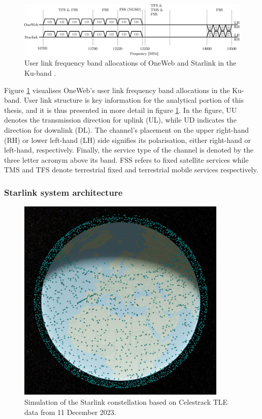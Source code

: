 \documentclass[english, 12pt, a4paper, elec, utf8, a-1b, online]{aaltothesis}
\begin{document}
\begin{figure}[h]
  \centering
  \includegraphics[width=145mm]{figures/fig-ku-band.eps}
  \caption{User link frequency band allocations of OneWeb and Starlink in the Ku-band \cite{portillo2019technical}.}
  \label{fig-ku-band}
\end{figure}

Figure \ref{fig-ku-band} visualises OneWeb's user link frequency band allocations in the Ku-band.
User link structure is key information for the analytical portion of this thesis, and it is thus presented in more detail in figure \ref{fig-ku-band}.
In the figure, UU denotes the transmission direction for uplink (UL), while UD indicates the direction for downlink (DL).
The channel's placement on the upper right-hand (RH) or lower left-hand (LH) side signifies its polarisation, either right-hand or left-hand, respectively.
Finally, the service type of the channel is denoted by the three letter acronym above its band.
FSS refers to fixed satellite services while TMS and TFS denote terrestrial fixed and terrestrial mobile services respectively.

\subsubsection{Starlink system architecture}

\begin{figure}[h]
  \centering
  \includegraphics[width=100mm]{figures/starlink-tle-2023-12-11-compressed.jpg}
  \caption{Simulation of the Starlink constellation based on Celestrack TLE data from 11 December 2023.}
  \label{fig-starlink-tle-2023-12-11}
\end{figure}
\end{document}
